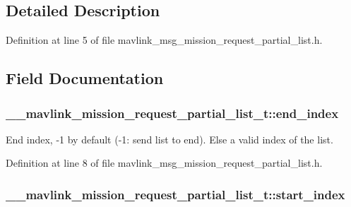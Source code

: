 \subsection{Detailed Description}


Definition at line 5 of file mavlink\-\_\-msg\-\_\-mission\-\_\-request\-\_\-partial\-\_\-list.\-h.



\subsection{Field Documentation}
\hypertarget{struct____mavlink__mission__request__partial__list__t_a9e484b80b2b8a0ced10f414e2d6c2636}{
\subsubsection[{end\-\_\-index}]{ \-\_\-\-\_\-mavlink\-\_\-mission\-\_\-request\-\_\-partial\-\_\-list\-\_\-t\-::end\-\_\-index}}\label{struct____mavlink__mission__request__partial__list__t_a9e484b80b2b8a0ced10f414e2d6c2636}


End index, -\/1 by default (-\/1\-: send list to end). Else a valid index of the list. 



Definition at line 8 of file mavlink\-\_\-msg\-\_\-mission\-\_\-request\-\_\-partial\-\_\-list.\-h.

\hypertarget{struct____mavlink__mission__request__partial__list__t_aa88d56cd8a892b8416b49a6e0ec9b5cf}{
\subsubsection[{start\-\_\-index}]{ \-\_\-\-\_\-mavlink\-\_\-mission\-\_\-request\-\_\-partial\-\_\-list\-\_\-t\-::start\-\_\-index}}\label{struct____mavlink__mission__request__partial__list__t_aa88d56cd8a892b8416b49a6e0ec9b5cf}


